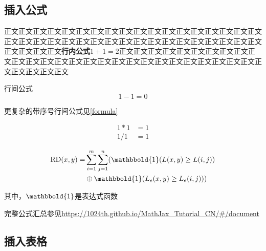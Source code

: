 \documentclass[a4paper]{article}
\begin{document}
\subsection{插入公式}
正文正文正文正文正文正文正文正文正文正文正文正文正文正文正文正文正文正文正文正文正文正文正文正文正文正文正文正文正文正文正文正文正文正文正文正文正文正文正文正文\textbf{行内公式}$1+1=2$正文正文正文正文正文正文正文正文正文正文正文正文正文正文正文正文正文正文正文正文正文正文正文正文正文正文正文正文正文正文正文正文

行间公式
$$
1-1=0
$$

更复杂的带序号行间公式见\ref{formula}

\begin{equation}
\begin{aligned}
1*1&=1\\
1/1&=1
\end{aligned}
\label{formula}
\end{equation}

\begin{equation*}
\begin{aligned}
\text{RD}(x,y) = &\sum_{i=1}^{m}\sum_{j=1}^{n}(\mathbbold{1}(L(x,y)\geq L(i,j))\\
& \oplus \mathbbold{1}(L_e(x,y)\geq L_e(i,j))) 
\end{aligned}
\end{equation*}

其中，$\mathbbold{1}$是表达式函数

完整公式汇总参见\url{https://1024th.github.io/MathJax_Tutorial_CN/#/document}

\newpage
\subsection{插入表格}
\end{document}
